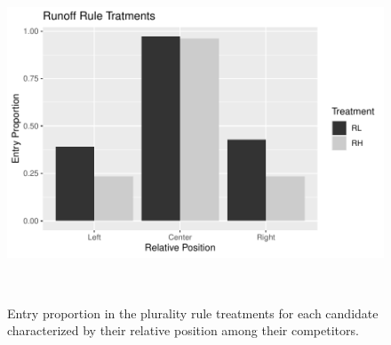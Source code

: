 \begin{figure}
	\includegraphics[width=1\linewidth, height=10cm]{barplot_prop_runoffs.pdf} 
	\caption{Entry proportion in the plurality rule treatments for each candidate characterized by their relative position among their competitors.}
	\label{fig:barplot_ROs}
\end{figure}
